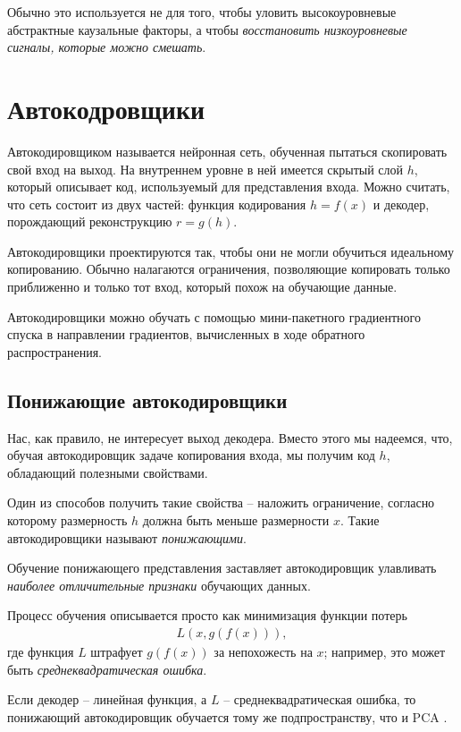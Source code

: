 \documentclass[%
	11pt,
	a4paper,
	utf8,
]{article}
\begin{document}
Обычно это используется не для того, чтобы уловить высокоуровневые абстрактные каузальные факторы, а чтобы \emph{восстановить низкоуровневые сигналы, которые можно смешать}.


\section{Автокодровщики}

Автокодировщиком называется нейронная сеть, обученная пытаться скопировать свой вход на выход. На внутреннем уровне в ней имеется скрытый слой $ h $, который описывает код, используемый для представления входа. Можно считать, что сеть состоит из двух частей: функция кодирования $ h = f(x) $ и декодер, порождающий реконструкцию $ r = g(h) $.

Автокодировщики проектируются так, чтобы они не могли обучиться идеальному копированию. Обычно налагаются ограничения, позволяющие копировать только приближенно и только тот вход, который похож на обучающие данные.

Автокодировщики можно обучать с помощью мини-пакетного градиентного спуска в направлении градиентов, вычисленных в ходе обратного распространения.

\subsection{Понижающие автокодировщики}

Нас, как правило, не интересует выход декодера. Вместо этого мы надеемся, что, обучая автокодировщик задаче копирования входа, мы получим код $ h $, обладающий полезными свойствами.

Один из способов получить такие свойства -- наложить ограничение, согласно которому размерность $ h $ должна быть меньше размерности $ x $. Такие автокодировщики называют \emph{понижающими}.

Обучение понижающего представления заставляет автокодировщик улавливать \emph{наиболее отличительные признаки} обучающих данных.

Процесс обучения описывается просто как минимизация функции потерь
\begin{align*}
	L(x, g(f(x))),
\end{align*}
где функция $ L $ штрафует $ g(f(x)) $ за непохожесть на $ x $; например, это может быть \emph{среднеквадратическая ошибка}.

Если декодер -- линейная функция, а $ L $ -- среднеквадратическая ошибка, то понижающий автокодировщик обучается тому же подпространству, что и PCA \cite[]{goodfellow:ml-2018}.
\end{document}
